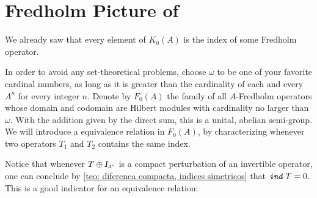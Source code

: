 
\section[Fredholm Picture of \texorpdfstring{\ensuremath{K_0(A)}}{K0(A)}]{Fredholm Picture of \texorpdfstring{}{K0(A)}}

We already saw that every element of $K_0(A)$ is the index of some Fredholm operator.

In order to avoid any set-theoretical problems, choose $\omega$ to be one of your favorite cardinal numbers, as long as it is greater than the cardinality of each and every $A^n$ for every integer $n$. Denote by $F_0(A)$ the family of all $A$-Fredholm operators whose domain and codomain are Hilbert modules with cardinality no larger than $\omega$. With the addition given by the direct sum, this is a unital, abelian semi-group. We will introduce a equivalence relation in $F_0(A)$, by characterizing whenever two operators $T_1$ and $T_2$ contains the same index.

Notice that whenever $T \oplus \sub\Id{A^n}$ is a compact perturbation of an invertible operator, one can conclude by \ref{teo: diferenca compacta, indices simetricos} that $\texttt{\textit{ind}}\, T = 0$. This is a good indicator for an equivalence relation:

